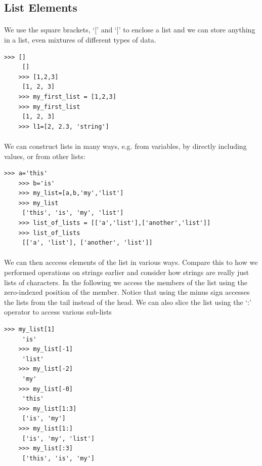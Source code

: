 \documentclass[12pt, a4paper, oneside]{book}
\begin{document}
{\subsection{List Elements}
\paragraph{} We use the square brackets, `$[$' and `$]$' to enclose a list and we can store anything in a list, even mixtures of different types of data.

\begin{lstlisting}[style=DOS]
    >>> []
     []
    >>> [1,2,3]
     [1, 2, 3]
    >>> my_first_list = [1,2,3]
    >>> my_first_list
     [1, 2, 3]
    >>> l1=[2, 2.3, 'string']
\end{lstlisting}

\paragraph{} We can construct lists in many ways, e.g. from variables, by directly including values, or from other lists:
\begin{lstlisting}[style=DOS]
    >>> a='this'
    >>> b='is'
    >>> my_list=[a,b,'my','list']
    >>> my_list
     ['this', 'is', 'my', 'list']
    >>> list_of_lists = [['a','list'],['another','list']]
    >>> list_of_lists
     [['a', 'list'], ['another', 'list']]
\end{lstlisting}

\paragraph{} We can then acccess elements of the list in various ways. Compare this to how we performed operations on strings earlier and consider how strings are really just lists of characters. In the following we access the members of the list using the zero-indexed position of the member. Notice that using the minus sign accesses the lists from the tail instead of the head. We can also slice the list using the `:' operator to access various sub-lists

\begin{lstlisting}[style=DOS]
    >>> my_list[1]
     'is'
    >>> my_list[-1]
     'list'
    >>> my_list[-2]
     'my'
    >>> my_list[-0]
     'this'
    >>> my_list[1:3]
     ['is', 'my']
    >>> my_list[1:]
     ['is', 'my', 'list']
    >>> my_list[:3]
     ['this', 'is', 'my']
\end{lstlisting}

}
\end{document}
